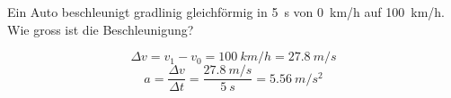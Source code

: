 
\begin{aufgabe}
Ein Auto beschleunigt gradlinig gleichförmig in \SI{5}{s} von \SI{0}{km/h} auf \SI{100}{km/h}.
Wie gross ist die Beschleunigung?


\begin{loesung}
\[\Delta v = v_1-v_0=\SI{100}{km/h}= \SI{27.8}{m/s}\]
\[a=\frac{\Delta v}{\Delta t} =\frac{\SI{27.8}{m/s}}{\SI{5}{s}} = \SI{5.56}{m/s^2}\]
\end{loesung}
\end{aufgabe}

